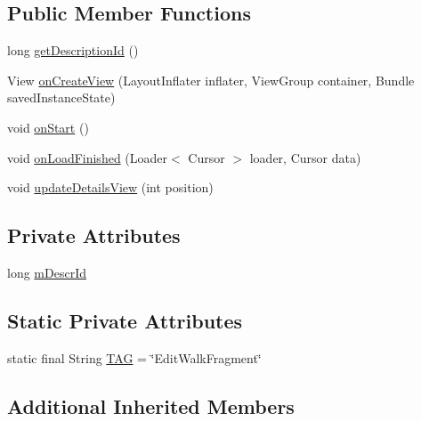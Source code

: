 \subsection*{Public Member Functions}
\begin{DoxyCompactItemize}
\item 
long \hyperlink{classuk_1_1ac_1_1swan_1_1digitaltrails_1_1fragments_1_1_edit_walk_fragment_a5d529fb60421b2e55446ff158ff3988f}{get\+Description\+Id} ()
\item 
View \hyperlink{classuk_1_1ac_1_1swan_1_1digitaltrails_1_1fragments_1_1_edit_walk_fragment_a5d2cda3440bd1606c439d32ce2606c85}{on\+Create\+View} (Layout\+Inflater inflater, View\+Group container, Bundle saved\+Instance\+State)
\item 
void \hyperlink{classuk_1_1ac_1_1swan_1_1digitaltrails_1_1fragments_1_1_edit_walk_fragment_a22017e0d44ca0d9153ce181b75827536}{on\+Start} ()
\item 
void \hyperlink{classuk_1_1ac_1_1swan_1_1digitaltrails_1_1fragments_1_1_edit_walk_fragment_abcac454bb1546a8846e218f280b0eaf5}{on\+Load\+Finished} (Loader$<$ Cursor $>$ loader, Cursor data)
\item 
void \hyperlink{classuk_1_1ac_1_1swan_1_1digitaltrails_1_1fragments_1_1_edit_walk_fragment_aeea5a4bd3b3bba9c0c7a837cceae587e}{update\+Details\+View} (int position)
\end{DoxyCompactItemize}
\subsection*{Private Attributes}
\begin{DoxyCompactItemize}
\item 
long \hyperlink{classuk_1_1ac_1_1swan_1_1digitaltrails_1_1fragments_1_1_edit_walk_fragment_adc1bc6db32e11a7e404a155f0d21f8b6}{m\+Descr\+Id}
\end{DoxyCompactItemize}
\subsection*{Static Private Attributes}
\begin{DoxyCompactItemize}
\item 
static final String \hyperlink{classuk_1_1ac_1_1swan_1_1digitaltrails_1_1fragments_1_1_edit_walk_fragment_aebb6ba79e76b59ec1e6db49d48321f28}{T\+A\+G} = \char`\"{}Edit\+Walk\+Fragment\char`\"{}
\end{DoxyCompactItemize}
\subsection*{Additional Inherited Members}


